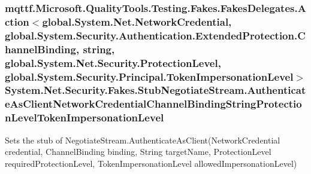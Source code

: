 \hypertarget{class_system_1_1_net_1_1_security_1_1_fakes_1_1_stub_negotiate_stream_a8c673b3e156e152baeda812992f60bec}{
\subsubsection[{Authenticate\-As\-Client\-Network\-Credential\-Channel\-Binding\-String\-Protection\-Level\-Token\-Impersonation\-Level}]{\setlength{\rightskip}{0pt plus 5cm}mqttf.\-Microsoft.\-Quality\-Tools.\-Testing.\-Fakes.\-Fakes\-Delegates.\-Action$<$global.\-System.\-Net.\-Network\-Credential, global.\-System.\-Security.\-Authentication.\-Extended\-Protection.\-Channel\-Binding, string, global.\-System.\-Net.\-Security.\-Protection\-Level, global.\-System.\-Security.\-Principal.\-Token\-Impersonation\-Level$>$ System.\-Net.\-Security.\-Fakes.\-Stub\-Negotiate\-Stream.\-Authenticate\-As\-Client\-Network\-Credential\-Channel\-Binding\-String\-Protection\-Level\-Token\-Impersonation\-Level}}\label{class_system_1_1_net_1_1_security_1_1_fakes_1_1_stub_negotiate_stream_a8c673b3e156e152baeda812992f60bec}


Sets the stub of Negotiate\-Stream.\-Authenticate\-As\-Client(\-Network\-Credential credential, Channel\-Binding binding, String target\-Name, Protection\-Level required\-Protection\-Level, Token\-Impersonation\-Level allowed\-Impersonation\-Level)

